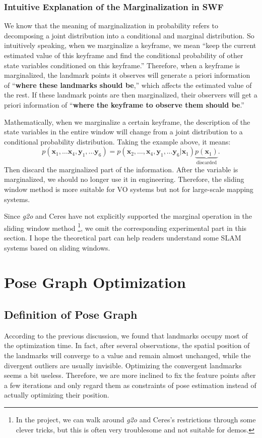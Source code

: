\subsubsection{Intuitive Explanation of the Marginalization in SWF}
We know that the meaning of marginalization in probability refers to decomposing a joint distribution into a conditional and marginal distribution. So intuitively speaking, when we marginalize a keyframe, we mean ``keep the current estimated value of this keyframe and find the conditional probability of other state variables conditioned on this keyframe.'' Therefore, when a keyframe is marginalized, the landmark points it observes will generate a priori information of ``\textbf{where these landmarks should be},'' which affects the estimated value of the rest. If these landmark points are then marginalized, their observers will get a priori information of ``\textbf{where the keyframe to observe them should be}.''

Mathematically, when we marginalize a certain keyframe, the description of the state variables in the entire window will change from a joint distribution to a conditional probability distribution. Taking the example above, it means:
\begin{equation}
	p\left( {{\bm{x}_1}, \ldots {\bm{x}_4},{\bm{y}_1}, \ldots {\bm{y}_6}} \right) = p\left( {{\bm{x}_2}, \ldots ,{\bm{x}_4},{\bm{y}_1}, \ldots {\bm{y}_6}|{\bm{x}_1}} \right)\underbrace {p\left( {{\bm{x}_1}} \right)}_{\text{discarded}}.
\end{equation}
Then discard the marginalized part of the information. After the variable is marginalized, we should no longer use it in engineering. Therefore, the sliding window method is more suitable for VO systems but not for large-scale mapping systems.

Since \textit{g2o} and Ceres have not explicitly supported the marginal operation in the sliding window method \footnote{In the project, we can walk around \textit{g2o} and Ceres's restrictions through some clever tricks, but this is often very troublesome and not suitable for demos. }, we omit the corresponding experimental part in this section. I hope the theoretical part can help readers understand some SLAM systems based on sliding windows.

\section{Pose Graph Optimization}
\subsection{Definition of Pose Graph}
According to the previous discussion, we found that landmarks occupy most of the optimization time. In fact, after several observations, the spatial position of the landmarks will converge to a value and remain almost unchanged, while the divergent outliers are usually invisible. Optimizing the convergent landmarks seems a bit useless. Therefore, we are more inclined to fix the feature points after a few iterations and only regard them as constraints of pose estimation instead of actually optimizing their position.

